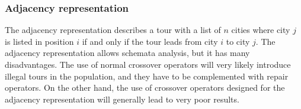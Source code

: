 ﻿\documentclass[a4paper,english,11pt,]{scrartcl}
\begin{document}
\subsubsection{Adjacency representation}

The adjacency representation describes a tour with a list of $n$ cities where city $j$ is listed in position $i$ if and only if the tour leads from city $i$ to city $j$. The adjacency representation allows schemata analysis, but it has many disadvantages. The use of normal crossover operators will very likely introduce illegal tours in the population, and they have to be complemented with repair operators. On the other hand, the use of crossover operators designed for the adjacency representation will generally lead to very poor results. 
\end{document}
